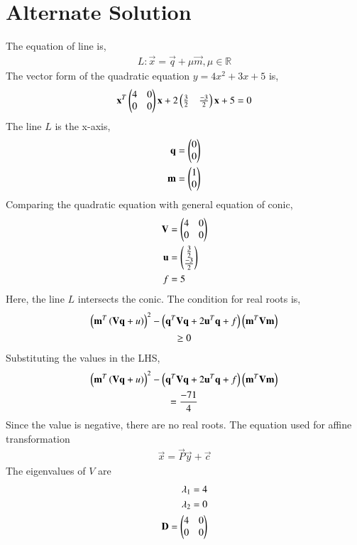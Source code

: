 \documentclass[journal,12pt,twocolumn]{IEEEtran}
\begin{document}
\section*{Alternate Solution}
The equation of line is,
\begin{align}
    L: \vec{x} = \vec{q} + \mu\vec{m}, \mu \in \mathbb{R}
\end{align}
The vector form of the quadratic equation $y = 4x^2 + 3x + 5$ is,
\begin{align}
    \mathbf{x}^T\begin{pmatrix}4 & 0\\0 & 0\end{pmatrix}\mathbf{x} + 2\begin{pmatrix}\frac{3}{2} & \frac{-3}{2}\end{pmatrix}\mathbf{x} + 5 = 0
\end{align}
The line $L$ is the x-axis,
\begin{align}
    \mathbf{q} = \begin{pmatrix}0 \\ 0\end{pmatrix}\\
    \mathbf{m} = \begin{pmatrix}1 \\ 0\end{pmatrix}
\end{align}
Comparing the quadratic equation with general equation of conic,
\begin{align}
    \mathbf{V} &= \begin{pmatrix}4 & 0 \\ 0 & 0\end{pmatrix}\\
    \mathbf{u} &= \begin{pmatrix}\frac{3}{2}\\\frac{-3}{2}\end{pmatrix}\\
    f &= 5
\end{align}
Here, the line $L$ intersects the conic. The condition for real roots is,
\begin{multline}
    \left(\mathbf{m}^T\left(\mathbf{V}\mathbf{q} + u\right)\right)^2 - \left(\mathbf{q}^T\mathbf{V}\mathbf{q} + 2\mathbf{u}^T\mathbf{q} + f\right)\left(\mathbf{m}^T\mathbf{V}\mathbf{m}\right)\\ \geq 0
\end{multline}
Substituting the values in the LHS,
\begin{multline}
    \left(\mathbf{m}^T\left(\mathbf{V}\mathbf{q} + u\right)\right)^2 - \left(\mathbf{q}^T\mathbf{V}\mathbf{q} + 2\mathbf{u}^T\mathbf{q} + f\right)\left(\mathbf{m}^T\mathbf{V}\mathbf{m}\right)\\ = \frac{-71}{4}
\end{multline}
Since the value is negative, there are no real roots. The equation used for affine transformation
\begin{align}
    \vec{x} = \vec{P}\vec{y} + \vec{c}
\end{align}
The eigenvalues of $V$ are
\begin{align}
    \lambda_1 = 4\\
    \lambda_2 = 0\\
    \mathbf{D} = \begin{pmatrix}4 & 0\\0 & 0\end{pmatrix}
\end{align}
\end{document}
